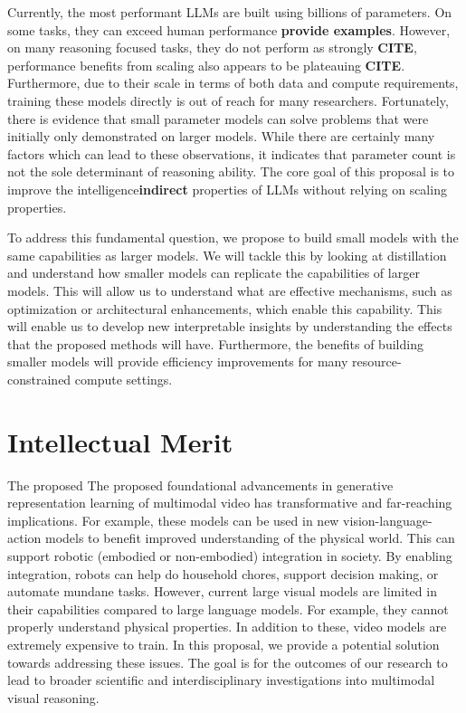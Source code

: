 Currently, the most performant LLMs are built using billions of parameters. On some tasks, they can exceed human performance \textbf{provide examples}. However, on many reasoning focused tasks, they do not perform as strongly \textbf{CITE}, performance benefits from scaling also appears to be plateauing \textbf{CITE}. Furthermore, due to their scale in terms of both data and compute requirements, training these models directly is out of reach for many researchers. Fortunately, there is evidence that small parameter models can solve problems that were initially only demonstrated on larger models. While there are certainly many factors which can lead to these observations, it indicates that parameter count is not the sole determinant of reasoning ability. The core goal of this proposal is to improve the intelligence\textbf{indirect} properties of LLMs without relying on scaling properties. 

To address this fundamental question, we propose to build small models with the same capabilities as larger models. We will tackle this by looking at distillation and understand how smaller models can replicate the capabilities of larger models. This will allow us to understand what are effective mechanisms, such as optimization or architectural enhancements, which enable this capability. This will enable us to develop new interpretable insights by understanding the effects that the proposed methods will have. Furthermore, the benefits of building smaller models will provide efficiency improvements for many resource-constrained compute settings. 




\section*{Intellectual Merit}

The proposed
The proposed foundational advancements in generative representation learning of multimodal video has transformative and far-reaching implications. For example, these models can be used in new vision-language-action models to benefit improved understanding of the physical world. This can support robotic (embodied or non-embodied) integration in society. By enabling integration, robots can help do household chores, support decision making, or automate mundane tasks. However, current large visual models are limited in their capabilities compared to large language models. For example, they cannot properly understand physical properties. In addition to these, video models are extremely expensive to train. In this proposal, we provide a potential solution towards addressing these issues. The goal is for the outcomes of our research to lead to broader scientific and interdisciplinary investigations into multimodal visual reasoning. 

